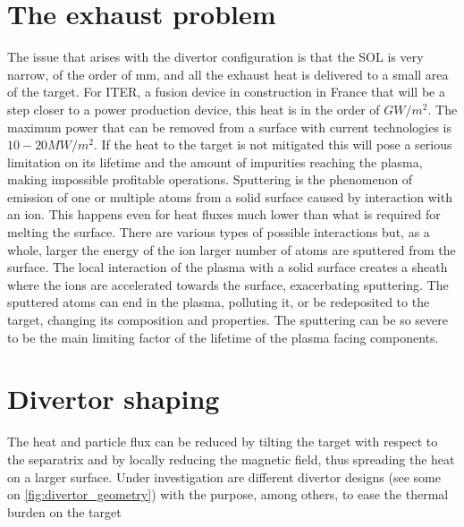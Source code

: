 \section{The exhaust problem}

The issue that arises with the divertor configuration is that the SOL is  very narrow, of the order of mm, and all the exhaust heat is delivered to a small area of the target. For ITER, a fusion device in construction in France that will be a step closer to a power production device, this heat is in the order of $GW/m^2$. The maximum power that can be removed from a surface with current technologies is $10-20MW/m^2$.\cite{Lipschultz2018} If the heat to the target is not mitigated this will pose a serious limitation on its lifetime and the amount of impurities reaching the plasma, making impossible profitable operations. 
Sputtering is the phenomenon of emission of one or multiple atoms from a solid surface caused by interaction with an ion. This happens even for heat fluxes much lower than what is required for melting the surface. There are various types of possible interactions but, as a whole, larger the energy of the ion larger number of atoms are sputtered from the surface. The local interaction of the plasma with a solid surface creates a sheath where the ions are accelerated towards the surface, exacerbating sputtering. The sputtered atoms can end in the plasma, polluting it, or be redeposited to the target, changing its composition and properties. The sputtering can be so severe to be the main limiting factor of the lifetime of the plasma facing components.

\section{Divertor shaping}

The heat and particle flux can be reduced by tilting the target with respect to the separatrix and by locally reducing the magnetic field, thus spreading the heat on a larger surface.
Under investigation are different divertor designs (see some on \autoref{fig:divertor_geometry}) with the purpose, among others, to ease the thermal burden on the target

